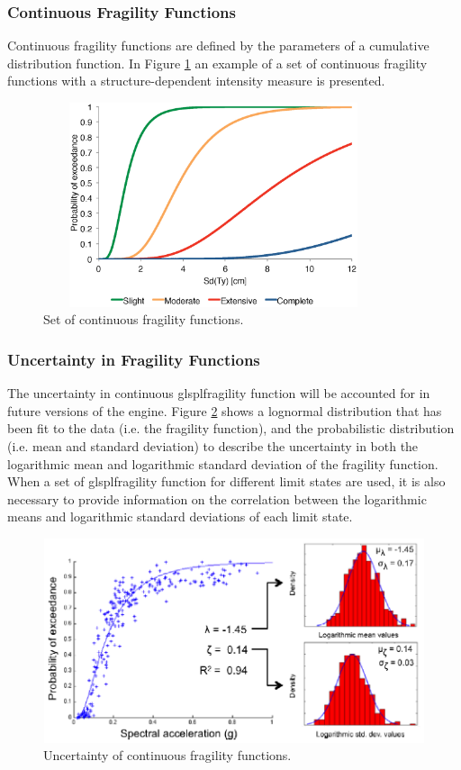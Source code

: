 \subsubsection{Continuous Fragility Functions}
Continuous \glspl{fragility function} are defined by the parameters of a cumulative distribution function. In Figure \ref{fig:FFcontinuous} an example of a set of continuous fragility functions with a structure-dependent intensity measure is presented. 

\begin{figure}[ht]
\centering
\includegraphics[width=10cm,height=6cm]{./figures/risk/FFContinuous.eps}
\caption{Set of continuous fragility functions.}
\label{fig:FFcontinuous}
\end{figure}

\color{blue}
\subsubsection{Uncertainty in Fragility Functions}
The uncertainty in continuous glspl{fragility function} will be accounted for in future versions of the engine. Figure \ref{fig:FF_uncertainty} shows a lognormal distribution that has been fit to the data (i.e. the fragility function), and the probabilistic distribution (i.e. mean and standard deviation) to describe the uncertainty in both the logarithmic mean and logarithmic standard deviation of the fragility function. When a set of glspl{fragility function} for different limit states are used, it is also necessary to provide information on the correlation between the logarithmic means and logarithmic standard deviations of each limit state.

\begin{figure}[ht]
\centering
\includegraphics[width=12cm,height=6cm]{./figures/risk/FFuncertainty.eps}
\caption{Uncertainty of continuous fragility functions.}
\label{fig:FF_uncertainty}
\end{figure}


